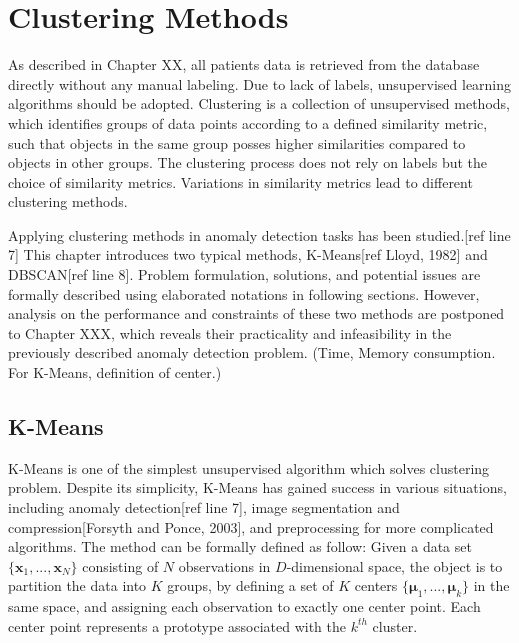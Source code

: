 \chapter{Clustering Methods}
\label{chapter:clustering}

As described in Chapter XX, all patients data is retrieved from the database directly without any manual labeling. Due to lack of labels, unsupervised learning algorithms should be adopted. Clustering is a collection of unsupervised methods, which identifies groups of data points according to a defined similarity metric, such that objects in the same group posses higher similarities compared to objects in other groups. The clustering process does not rely on labels but the choice of similarity metrics. Variations in similarity metrics lead to different clustering methods.

Applying clustering methods in anomaly detection tasks has been studied.[ref line 7] This chapter introduces two typical methods, K-Means[ref Lloyd, 1982] and DBSCAN[ref line 8]. Problem formulation, solutions, and potential issues are formally described using elaborated notations in following sections. However, analysis on the performance and constraints of these two methods are postponed to Chapter XXX, which reveals their practicality and infeasibility in the previously described anomaly detection problem. (Time, Memory consumption. For K-Means, definition of center.)

\section{K-Means}
\label{sec:k-means}

K-Means is one of the simplest unsupervised algorithm which solves clustering problem. Despite its simplicity, K-Means has gained success in various situations, including anomaly detection[ref line 7], image segmentation and compression[Forsyth and Ponce, 2003], and preprocessing for more complicated algorithms. The method can be formally defined as follow: Given a data set $\{\mathbf{x}_1, ... , \mathbf{x}_N\}$ consisting of $N$ observations in $D$-dimensional space, the object is to partition the data into $K$ groups, by defining a set of $K$ centers $\{\boldsymbol{\mu}_1, ... , \boldsymbol{\mu}_k\}$ in the same space, and assigning each observation to exactly one center point. Each center point represents a prototype associated with the $k^{th}$ cluster.

